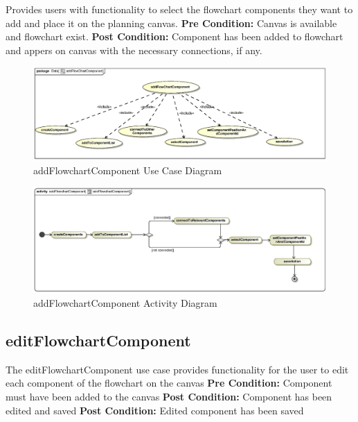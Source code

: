 \documentclass[12pt,a4paper,titlepage]{article}
\begin{document}
Provides users with functionality to select the flowchart components they want to add and place it on the planning canvas.\newline\newline
\textbf{Pre Condition:} Canvas is available and flowchart exist.\newline\newline
\textbf{Post Condition:} Component has been added to flowchart and appers on canvas with the necessary connections, if any.

\begin{figure}[H]
  \centering
\includegraphics[width=500px]{addFlowChartComponent.eps}
\caption{addFlowchartComponent Use Case Diagram}
\end{figure}

\begin{figure}[H]
  \centering
\includegraphics[width=500px]{addFlowchartComponentActivity.eps}
\caption{addFlowchartComponent Activity Diagram}
\end{figure}

\newpage
\subsection{editFlowchartComponent}

The editFlowchartComponent use case provides functionality for the user to edit each component of the flowchart on the canvas \newline\newline
\textbf{Pre Condition:} Component must have been added to the canvas\newline\newline
\textbf{Post Condition:} Component has been edited and saved\newline
\textbf{Post Condition:} Edited component has been saved
\end{document}
